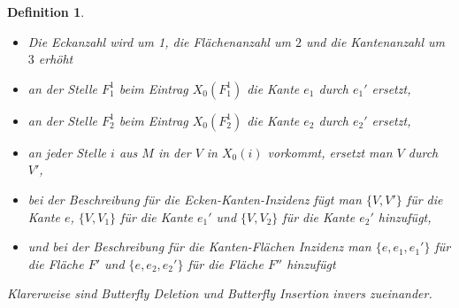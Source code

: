 \documentclass[12pt,titlepage,twoside,cleardoublepage]{article}
\theoremstyle{nummermitklammern}
\newtheorem{definition}[temp]{Definition}
\newtheorem{definition}[zahl]{Definition}
\numberwithin{equation}{section}
\begin{document}
\begin{definition}
 \begin{itemize}
 \item Die Eckanzahl wird um 1, die Flächenanzahl um $2$ und die Kantenanzahl um $3$ erhöht 
 \item an der Stelle $F_1^1$ beim Eintrag $X_0(F_1^1)$ die Kante $e_1$ durch $e_1'$ ersetzt,
 \item an der Stelle $F_2^1$ beim Eintrag $X_0(F_2^1)$ die Kante $e_2$ durch $e_2'$ ersetzt,
 \item an jeder Stelle $i$ aus $M$ in der $V$ in $X_0(i)$ vorkommt, ersetzt man $V$ durch $V'$,  
\item  bei der Beschreibung  für die Ecken-Kanten-Inzidenz fügt man $\{V,V'\}$ für die Kante $e$, $\{V,V_1\}$ für die Kante $e_1'$ und $\{V,V_2\}$ für die Kante $e_2'$ hinzufügt,
\item und bei der Beschreibung für die Kanten-Flächen Inzidenz  man $\{e,e_1,e_1'\}$ für die Fläche $F'$ und $\{e,e_2,e_2'\}$ für die Fläche $F''$ hinzufügt
 \end{itemize}
  Klarerweise sind Butterfly Deletion und Butterfly Insertion invers zueinander.
 \end{definition}
\end{document}
